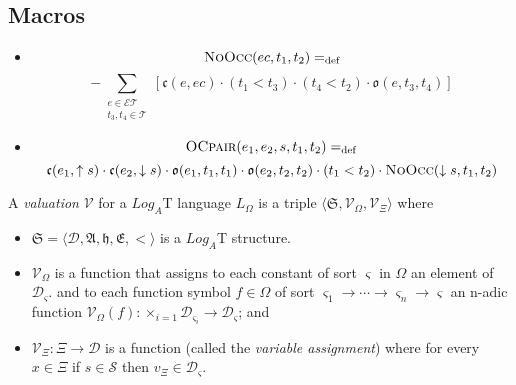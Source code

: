 \begin{itemize}
\begin{itemize}
	      \end{itemize}
\end{itemize}
\subsection{Macros}
\begin{itemize}
	\item \[\textsc{NoOcc}(ec, t_1, t_2) =_{\text{def}}\]
	      \[ -\sum_{\substack{{e \in \mathcal{ET}} \\ t_3, t_4 \in \mathcal{T}}}
		      [\mathfrak{c}(e, ec) \cdot (t_1 < t_3) \cdot (t_4 < t_2) \cdot \mathfrak{o}(e, t_3, t_4)]\]
	\item \[
		      \textsc{OCpair}(e_1, e_2, s, t_1, t_2) =_{\text{def}}
	      \]
	      \[
		      \mathfrak{c}(e_1, \uparrow s) \cdot \mathfrak{c}(e_2, \downarrow s) \cdot \mathfrak{o}(e_1, t_1, t_1) \cdot \mathfrak{o}(e_2, t_2, t_2) \cdot
		      (t_1 < t_2) \cdot \textsc{NoOcc}(\downarrow s, t_1, t_2)
	      \]
\end{itemize}
\begin{defn}
	A \textit{valuation} $\mathcal{V}$ for a $Log_A$T language $L_{\Omega}$ is a triple $\langle \mathfrak{S}, \mathcal{V}_{\Omega}, \mathcal{V}_{\Xi} \rangle$ where
\end{defn}
\begin{itemize}
	\item $\mathfrak{S} = \langle \mathcal{D}, \mathfrak{A}, \mathfrak{h},\mathfrak{E}, < \rangle$ is a $Log_A$T structure.
	\item $\mathcal{V}_{\Omega}$ is a function that assigns to each constant of sort $\varsigma$ in $\Omega$ an element of $\mathcal{D}_{\varsigma}$.
	      and to each function symbol $f \in \Omega$ of sort $\varsigma_1 \to \cdots \to \varsigma_n \to \varsigma$ an
	      n-adic function $\mathcal{V}_{\Omega}(f) :  \times_{i=1} \mathcal{D}_{\varsigma_i} \to \mathcal{D}_{\varsigma}$; and
	\item $\mathcal{V}_{\Xi} : \Xi \to \mathcal{D}$ is a function (called the \textit{variable assignment}) where
	      for every $x \in \Xi$ if $s \in \mathcal{S}$ then $v_{\Xi} \in \mathcal{D}_{\varsigma}$.
\end{itemize}

